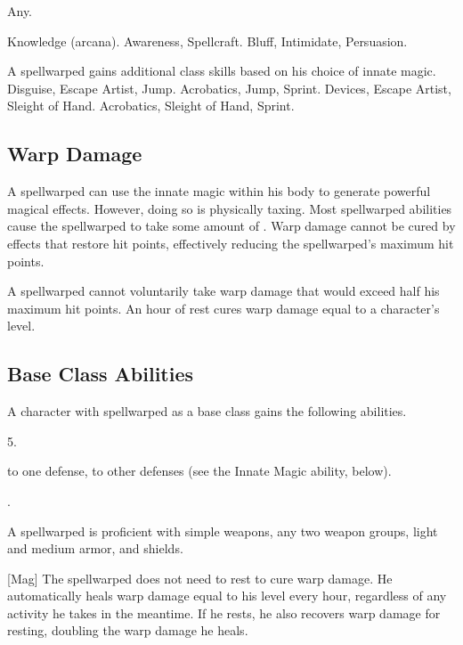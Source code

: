      Any.

     Knowledge (arcana).
     Awareness, Spellcraft.
     Bluff, Intimidate, Persuasion.

    A spellwarped gains additional class skills based on his choice of innate magic.
     Disguise, Escape Artist, Jump.
     Acrobatics, Jump, Sprint.
     Devices, Escape Artist, Sleight of Hand.
     Acrobatics, Sleight of Hand, Sprint.

    \subsection{Warp Damage}\label{Warp Damage}
        A spellwarped can use the innate magic within his body to generate powerful magical effects.
        However, doing so is physically taxing.
        Most spellwarped abilities cause the spellwarped to take some amount of .
        Warp damage cannot be cured by effects that restore hit points, effectively reducing the spellwarped's maximum hit points.

        A spellwarped cannot voluntarily take warp damage that would exceed half his maximum hit points.
        An hour of rest cures warp damage equal to a character's level.

    \subsection{Base Class Abilities}
        A character with spellwarped as a base class gains the following abilities.

         5.

          to one defense,  to other defenses (see the Innate Magic ability, below).

         .

        A spellwarped is proficient with simple weapons, any two weapon groups, light and medium armor, and shields.

        [Mag]
        The spellwarped does not need to rest to cure warp damage.
        He automatically heals warp damage equal to his level every hour, regardless of any activity he takes in the meantime.
        If he rests, he also recovers warp damage for resting, doubling the warp damage he heals.


